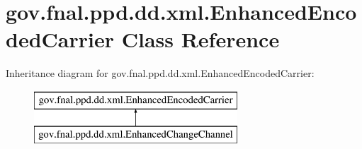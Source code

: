 \hypertarget{classgov_1_1fnal_1_1ppd_1_1dd_1_1xml_1_1EnhancedEncodedCarrier}{\section{gov.\-fnal.\-ppd.\-dd.\-xml.\-Enhanced\-Encoded\-Carrier Class Reference}
\label{classgov_1_1fnal_1_1ppd_1_1dd_1_1xml_1_1EnhancedEncodedCarrier}
}
Inheritance diagram for gov.\-fnal.\-ppd.\-dd.\-xml.\-Enhanced\-Encoded\-Carrier\-:\begin{figure}[H]
\begin{center}
\leavevmode
\includegraphics[height=2.000000cm]{classgov_1_1fnal_1_1ppd_1_1dd_1_1xml_1_1EnhancedEncodedCarrier}
\end{center}
\end{figure}

